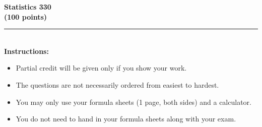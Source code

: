 

\begin{center}
  \textbf{\large \class{}} \hfill \textbf{\large Statistics 330} \hfill \textbf{\large \exam{}}\\
  \hfill \textbf{(100 points)}
\end{center}

\vspace*{1in}

 \rule{5in}{.01in}\\[1in]

\textbf{Instructions:}\\
\begin{itemize}
\item {\large Partial credit will be given only if you show your work.}
\item {\large The questions are not necessarily ordered from easiest to hardest.}
\item {\large You may only use your formula sheets (1 page, both sides) and a calculator.}
\item {\large You do not need to hand in your formula sheets along with your exam.}
\end{itemize}